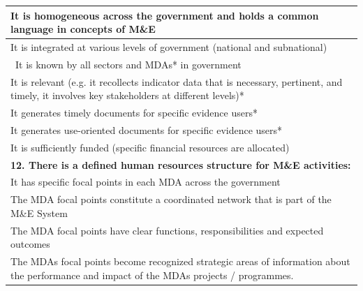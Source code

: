\documentclass[
  10pt,
]{book}
\begin{document}
\begin{table}
\begin{tabular}[t]{l}
\hline
\hspace{1em}It is homogeneous across the government and holds a common language in concepts of M\&E\\
\hline
\hspace{1em}It is integrated at various levels of government (national and subnational)\\
\hline
\hspace{1em} It is known by all sectors and MDAs* in government\\
\hline
\hspace{1em}It is relevant (e.g. it recollects indicator data that is necessary, pertinent, and timely, it involves key stakeholders at different levels)*\\
\hline
\hspace{1em}It generates timely documents for specific evidence users*\\
\hline
\hspace{1em}It generates use-oriented documents for specific evidence users*\\
\hline
\hspace{1em}It is sufficiently funded (specific financial resources are allocated)\\
\hline
\multicolumn{1}{l}{\textbf{12. There is a defined human resources structure for M\&E activities:}}\\
\hline
\hspace{1em}It has specific focal points in each MDA across the government\\
\hline
\hspace{1em}The MDA focal points constitute a coordinated network that is part of the M\&E System\\
\hline
\hspace{1em}The MDA focal points have clear functions, responsibilities and expected outcomes\\
\hline
\hspace{1em}The MDAs focal points become  recognized strategic areas of information about the performance and impact of the MDAs projects / programmes.\\
\hline
\end{tabular}
\end{table}
\end{document}
